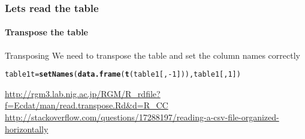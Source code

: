 \documentclass[12pt]{beamer}\usepackage[]{graphicx}\usepackage[]{color}
\makeatletter
\newcommand{\hlnum}[1]{\textcolor[rgb]{0.686,0.059,0.569}{#1}}%
\newcommand{\hlopt}[1]{\textcolor[rgb]{0,0,0}{#1}}%
\newcommand{\hlstd}[1]{\textcolor[rgb]{0.345,0.345,0.345}{#1}}%
\newcommand{\hlkwb}[1]{\textcolor[rgb]{0.69,0.353,0.396}{#1}}%
\newcommand{\hlkwd}[1]{\textcolor[rgb]{0.737,0.353,0.396}{\textbf{#1}}}%
\newenvironment{kframe}{%
 \def\at@end@of@kframe{}%
 \ifinner\ifhmode%
  \def\at@end@of@kframe{\end{minipage}}%
  \begin{minipage}{\columnwidth}%
 \fi\fi%
 \def\FrameCommand##1{\hskip\@totalleftmargin \hskip-\fboxsep
 \colorbox{shadecolor}{##1}\hskip-\fboxsep
     \hskip-\linewidth \hskip-\@totalleftmargin \hskip\columnwidth}%
 \MakeFramed {\advance\hsize-\width
   \@totalleftmargin\z@ \linewidth\hsize
   \@setminipage}}%
 {\par\unskip\endMakeFramed%
 \at@end@of@kframe}
\newenvironment{knitrout}{}{} %
\makeatother
\begin{document}
\begin{frame}[fragile]
  \frametitle{Lets read the table}
  \framesubtitle{Transpose the table}
  \begin{block}{Transposing}
  We need to transpose the table and set the column names correctly
  \end{block}
\begin{knitrout}
\color{fgcolor}\begin{kframe}
\begin{alltt}
\hlstd{table1t}\hlkwb{=}\hlkwd{setNames}\hlstd{(}\hlkwd{data.frame}\hlstd{(}\hlkwd{t}\hlstd{(table1[,}\hlopt{-}\hlnum{1}\hlstd{])),table1[,}\hlnum{1}\hlstd{])}
\end{alltt}
\end{kframe}
\end{knitrout}
\url{http://rgm3.lab.nig.ac.jp/RGM/R_rdfile?f=Ecdat/man/read.transpose.Rd&d=R_CC}
\url{http://stackoverflow.com/questions/17288197/reading-a-csv-file-organized-horizontally}
\end{frame}
\end{document}
